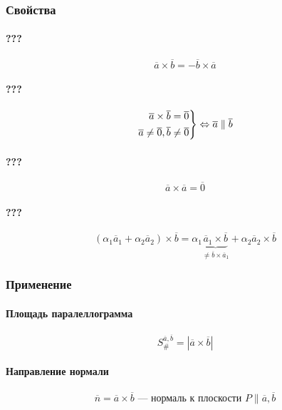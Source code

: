 \documentclass{article}
\newenvironment{rcases}
    {\left.\begin{aligned}}
    {\end{aligned}\right\rbrace}
\begin{document}
\subsubsection{Свойства}

\paragraph{???}
\[
    \overline{a} \times \overline{b} = -\overline{b} \times \overline{a}
\]

\paragraph{???}
\begin{align*} 
    \begin{rcases}
        \overline{a} \times \overline{b} = \overline{0} \\
        \overline{a} \neq \overline{0}, \overline{b} \neq \overline{0}    
    \end{rcases} \Leftrightarrow 
    \overline{a} \parallel \overline{b} 
\end{align*}

\paragraph{???}
\[
    \overline{a} \times \overline{a} = \overline{0}
\]

\paragraph{???}
\[
    \left( \alpha_1 \overline{a}_1 + \alpha_2 \overline{a}_2 \right) \times \overline{b} =
    \alpha_1 \underbrace{\overline{a}_1 \times \overline{b}}_{\neq \overline{b} \times \overline{a}_1} +
    \alpha_2 \overline{a}_2 \times \overline{b}
\]


\subsubsection{Применение}

\paragraph{Площадь паралеллограмма}
\[
    S_{\#}^{\overline{a}, \overline{b}} = \left| \overline{a} \times \overline{b} \right|
\]

\paragraph{Направление нормали}
\[
    \overline{n} = \overline{a} \times \overline{b} \text{ --- нормаль к плоскости } P \parallel \overline{a}, \overline{b}
\]
\end{document}
